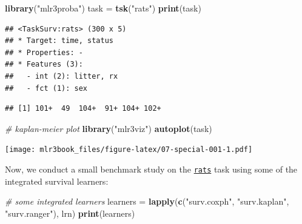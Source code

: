 \documentclass[]{article}
\newenvironment{Shaded}{\begin{snugshade}}{\end{snugshade}}
\newcommand{\CommentTok}[1]{\textcolor[rgb]{0.56,0.35,0.01}{\textit{#1}}}
\newcommand{\KeywordTok}[1]{\textcolor[rgb]{0.13,0.29,0.53}{\textbf{#1}}}
\newcommand{\NormalTok}[1]{#1}
\newcommand{\OperatorTok}[1]{\textcolor[rgb]{0.81,0.36,0.00}{\textbf{#1}}}
\newcommand{\StringTok}[1]{\textcolor[rgb]{0.31,0.60,0.02}{#1}}
\renewenvironment{Shaded} {\begin{snugshade}\small} {\end{snugshade}}
\begin{document}
\begin{Shaded}
\begin{Highlighting}[]
\KeywordTok{library}\NormalTok{(}\StringTok{"mlr3proba"}\NormalTok{)}
\NormalTok{task =}\StringTok{ }\KeywordTok{tsk}\NormalTok{(}\StringTok{"rats"}\NormalTok{)}
\KeywordTok{print}\NormalTok{(task)}
\end{Highlighting}
\end{Shaded}

\begin{verbatim}
## <TaskSurv:rats> (300 x 5)
## * Target: time, status
## * Properties: -
## * Features (3):
##   - int (2): litter, rx
##   - fct (1): sex
\end{verbatim}

\begin{Shaded}
\end{Shaded}

\begin{verbatim}
## [1] 101+  49  104+  91+ 104+ 102+
\end{verbatim}

\begin{Shaded}
\begin{Highlighting}[]
\CommentTok{# kaplan-meier plot}
\KeywordTok{library}\NormalTok{(}\StringTok{"mlr3viz"}\NormalTok{)}
\KeywordTok{autoplot}\NormalTok{(task)}
\end{Highlighting}
\end{Shaded}

\texttt{[image: mlr3book\_files/figure-latex/07-special-001-1.pdf]}

Now, we conduct a small benchmark study on the \href{https://mlr3proba.mlr-org.com/reference/mlr_tasks_rats.html}{\texttt{rats}} task using some of the integrated survival learners:

\begin{Shaded}
\begin{Highlighting}[]
\CommentTok{# some integrated learners}
\NormalTok{learners =}\StringTok{ }\KeywordTok{lapply}\NormalTok{(}\KeywordTok{c}\NormalTok{(}\StringTok{"surv.coxph"}\NormalTok{, }\StringTok{"surv.kaplan"}\NormalTok{, }\StringTok{"surv.ranger"}\NormalTok{), lrn)}
\KeywordTok{print}\NormalTok{(learners)}
\end{Highlighting}
\end{Shaded}
\end{document}
